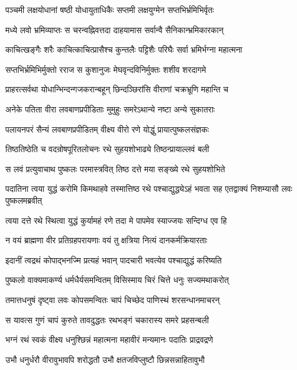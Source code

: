 \twolineshloka
{पञ्चमी लक्षयोधानां षष्ठी योधायुताधिकैः}
{सप्तमी लक्षयुग्मेन सप्तभिर्भ्रमिभिर्वृतः}%

\twolineshloka
{मध्ये लवो भ्रमिव्याप्तः स चरन्वह्निवत्तदा}
{दाहयामास सर्वान्वै सैनिकान्भ्रमिकारकान्}%

\twolineshloka
{काचित्खङ्गैः शरैः काचित्काचित्प्रासैश्च कुन्तलैः}
{पट्टिशैः परिघैः सर्वा भ्रमिर्भग्ना महात्मना}%

\twolineshloka
{सप्तभिर्भ्रमिभिर्मुक्तो रराज स कुशानुजः}
{मेघवृन्दविनिर्मुक्तः शशीव शरदागमे}%

\twolineshloka
{प्राहरत्सर्वथा योधान्भिन्दन्गजकरान्बहून्}
{छिन्दञ्छिरांसि वीराणां चक्रभ्रूणि महान्ति च}%

\twolineshloka
{अनेके पतिता वीरा लवबाणप्रपीडिताः}
{मुमुहुः समरेऽथान्ये नष्टा अन्ये सुकातराः}%

\twolineshloka
{पलायनपरं सैन्यं लवबाणप्रपीडितम्}
{वीक्ष्य वीरो रणे योद्धुं प्रायात्पुष्कलसंज्ञकः}%

\twolineshloka
{तिष्ठतिष्ठेति च वदन्रोषपूरितलोचनः}
{रथे सुहयशोभाढ्ये तिष्ठन्प्रायाल्लवं बली}%

\twolineshloka
{स लवं प्रत्युवाचाथ पुष्कलः परमास्त्रवित्}
{तिष्ठ दत्ते मया सङ्ख्ये रथे सुहयशोभिते}%


\threelineshloka
{पदातिना त्वया युद्धं करोमि किमथाहवे}
{तस्मात्तिष्ठ रथे पश्चाद्युद्ध्येऽहं भवता सह}
{एतद्वाक्यं निशम्यासौ लवः पुष्कलमब्रवीत्}%

\twolineshloka
{त्वया दत्ते रथे स्थित्वा युद्धं कुर्यामहं रणे}
{तदा मे पापमेव स्याज्जयः सन्दिग्ध एव हि}%

\twolineshloka
{न वयं ब्राह्मणा वीर प्रतिग्रहपरायणाः}
{वयं तु क्षत्रिया नित्यं दानकर्मक्रियारताः}%

\twolineshloka
{इदानीं त्वद्रथं कोपाद्भनज्मि प्रत्यहं भवान्}
{पादचारी भवत्येव पश्चाद्युद्धं करिष्यति}%

\twolineshloka
{पुष्कलो वाक्यमाकर्ण्य धर्मधैर्यसमन्वितम्}
{विसिस्माय चिरं चित्ते धनुः सज्यमथाकरोत्}%

\twolineshloka
{तमात्तधनुषं दृष्ट्वा लवः कोपसमन्वितः}
{चापं चिच्छेद पाणिस्थं शरसन्धानमाचरन्}%

\twolineshloka
{स यावत्स गुणं चापं कुरुते तावदुद्धतः}
{रथभङ्गं चकारास्य समरे प्रहसन्बली}%

\twolineshloka
{भग्नं रथं स्वकं वीक्ष्य धनुश्छिन्नं महात्मना}
{महावीरं मन्यमानः पदातिः प्राद्रवद्रणे}%

\twolineshloka
{उभौ धनुर्धरौ वीरावुभावपि शरोद्धतौ}
{उभौ क्षतजविप्लुष्टौ छिन्नसन्नाहितावुभौ}%

